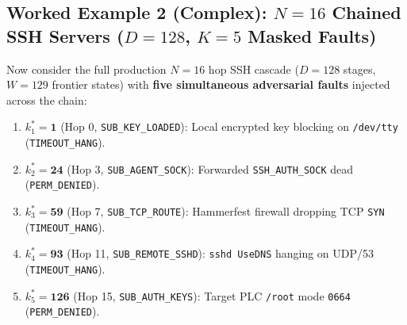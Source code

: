 \documentclass[11pt,a4paper]{article}
\theoremstyle{definition}
\theoremstyle{remark}
\begin{document}
\subsection{Worked Example 2 (Complex): $N=16$ Chained SSH Servers ($D=128$, $K=5$ Masked Faults)}

Now consider the full production $N=16$ hop SSH cascade ($D = 128$ stages, $W = 129$ frontier states) with \textbf{five simultaneous adversarial faults} injected across the chain:
\begin{enumerate}[noitemsep]
    \item $k_1^* = \mathbf{1}$ (Hop 0, \texttt{SUB\_KEY\_LOADED}): Local encrypted key blocking on \texttt{/dev/tty} (\texttt{TIMEOUT\_HANG}).
    \item $k_2^* = \mathbf{24}$ (Hop 3, \texttt{SUB\_AGENT\_SOCK}): Forwarded \texttt{SSH\_AUTH\_SOCK} dead (\texttt{PERM\_DENIED}).
    \item $k_3^* = \mathbf{59}$ (Hop 7, \texttt{SUB\_TCP\_ROUTE}): Hammerfest firewall dropping TCP \texttt{SYN} (\texttt{TIMEOUT\_HANG}).
    \item $k_4^* = \mathbf{93}$ (Hop 11, \texttt{SUB\_REMOTE\_SSHD}): \texttt{sshd UseDNS} hanging on UDP/53 (\texttt{TIMEOUT\_HANG}).
    \item $k_5^* = \mathbf{126}$ (Hop 15, \texttt{SUB\_AUTH\_KEYS}): Target PLC \texttt{/root} mode \texttt{0664} (\texttt{PERM\_DENIED}).
\end{enumerate}
\end{document}
